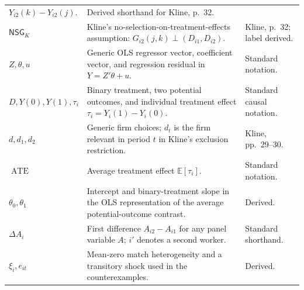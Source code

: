 \documentclass[11pt]{article}
\begin{document}
\begin{longtable}{p{}p{}p{}}
\(Y_{i2}(k)-Y_{i2}(j)\). & Derived shorthand for Kline, p.\ 32. \\
\(\mathsf{NSG}_{K}\) & Kline's no-selection-on-treatment-effects assumption:
\(G_{i2}(j,k)\perp(D_{i1},D_{i2})\). & Kline, p.\ 32; label derived. \\
\(Z,\theta,u\) & Generic OLS regressor vector, coefficient vector, and
regression residual in \(Y=Z'\theta+u\). & Standard notation. \\
\(D,Y(0),Y(1),\tau_i\) & Binary treatment, two potential outcomes, and
individual treatment effect \(\tau_i=Y_i(1)-Y_i(0)\). & Standard causal
notation. \\
\(d,d_1,d_2\) & Generic firm choices; \(d_t\) is the firm relevant in period
\(t\) in Kline's exclusion restriction. & Kline, pp.\ 29--30. \\
\(\operatorname{ATE}\) & Average treatment effect
\(\mathbb E[\tau_i]\). & Standard notation. \\
\(\theta_0,\theta_1\) & Intercept and binary-treatment slope in the OLS
representation of the average potential-outcome contrast. & Derived. \\
\(\Delta A_i\) & First difference \(A_{i2}-A_{i1}\) for any panel variable
\(A\); \(i'\) denotes a second worker. & Standard shorthand. \\
\(\xi_i,e_{it}\) & Mean-zero match heterogeneity and a transitory shock used
in the counterexamples. & Derived. \\
\end{longtable}
\end{document}
